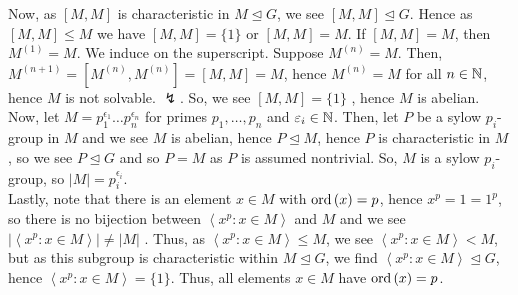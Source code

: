 \documentclass[a4paper]{article}
\begin{document}
	\begin{solution}[4]
	Now, as \(\left[ M, M \right] \)  is characteristic in \(M \trianglelefteq G\), we see \(\left[ M, M \right] \trianglelefteq G\). Hence as \(\left[ M, M \right] \le M\) we have \(\left[ M, M \right] = \{1\} \) or \(\left[ M, M \right]  = M\). If \(\left[ M, M \right] = M\), then \(M^{\left( 1 \right) } = M\). We induce on the superscript. Suppose \(M^{\left( n \right) } = M\). Then, \(M^{\left( n + 1 \right) } = \left[ M^{\left( n \right) }, M^{\left( n \right) } \right]  = \left[ M, M \right]  = M\), hence \(M^{\left( n \right) } = M\)  for all \(n \in \mathbb{N}\), hence \(M\) is not solvable. \(\lightning\). So, we see \(\left[ M, M \right] =\{1\} \) , hence \(M\) is abelian.\\
	Now, let \(M = p_1^{\epsilon_1} \ldots p_{n}^{\epsilon_{n}}\) for primes \(p_1, \ldots, p_{n}\)  and \(\varepsilon _{i} \in \mathbb{N}\). Then, let \(P\) be a sylow \(p_{i}\)-group in \(M\)  and we see \(M\) is abelian, hence \(P \trianglelefteq M\), hence \(P\) is characteristic in \(M\), so we see \(P \trianglelefteq G\)  and so \(P = M\) as \(P\) is assumed nontrivial. So, \(M\) is a sylow \(p _{i} \)-group, so \(\left| M \right| = p _{i}^{\epsilon_{i}}\).\\
	Lastly, note that there is an element \(x \in M\)  with \(\operatorname{ord}\left( x \right)  = p\), hence \(x^{p} = 1 = 1^{p}\), so there is no bijection between \(\left<x^{p} : x \in M \right> \)  and \(M\) and we see \(\left| \left<x^{p}: x\in M \right>  \right|  \neq \left| M \right| \) . Thus, as \(\left<x^{p} : x \in M \right> \le M \), we see \(\left<x^{p} : x \in M \right> < M \), but as this subgroup is characteristic within \(M \trianglelefteq G\), we find \(\left<x^{p} : x \in M \right> \trianglelefteq G \), hence \(\left<x^{p} : x \in M \right>  = \{1\} \). Thus, all elements \(x \in M\)  have \(\operatorname{ord}\left( x \right)  = p\).
\end{solution}
\newpage
\end{document}
